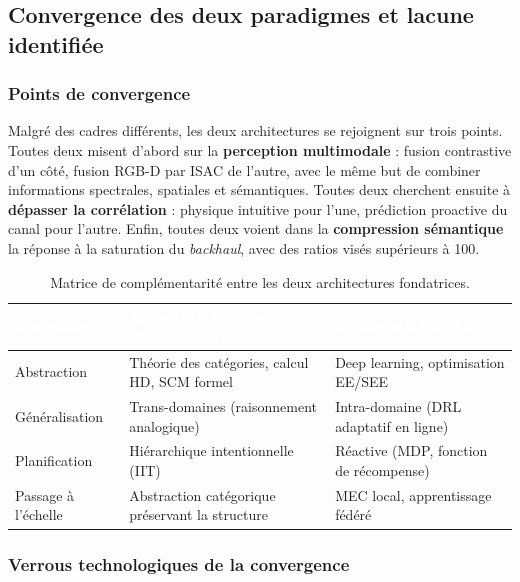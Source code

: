 \documentclass[12pt,a4paper,titlepage]{article}
\newcommand{\hd}[1]{\textcolor{white}{\textbf{#1}}}
\begin{document}
\subsection{Convergence des deux paradigmes et lacune identifiée}
\label{subsec:convergence}

\subsubsection{Points de convergence}

Malgré des cadres différents, les deux architectures se rejoignent sur trois points. Toutes deux misent d'abord sur la \textbf{perception multimodale} : fusion contrastive d'un côté, fusion RGB-D par ISAC de l'autre, avec le même but de combiner informations spectrales, spatiales et sémantiques. Toutes deux cherchent ensuite à \textbf{dépasser la corrélation} : physique intuitive pour l'une, prédiction proactive du canal pour l'autre. Enfin, toutes deux voient dans la \textbf{compression sémantique} la réponse à la saturation du \textit{backhaul}, avec des ratios visés supérieurs à 100.

\begin{table}[H]
    \centering
    \caption{Matrice de complémentarité entre les deux architectures fondatrices.}
    \label{tab:complementarity}
    \begin{tabularx}{\textwidth}{F{3cm}LL}
        \toprule
        \hd{Dimension} & \hd{Apport AGI-Native (Saad~\textit{et al.})} & \hd{Apport SA-VA-ISAC} \\
        \midrule
        Abstraction & Théorie des catégories, calcul HD, SCM formel & Deep learning, optimisation EE/SEE \\
        Généralisation & Trans-domaines (raisonnement analogique) & Intra-domaine (DRL adaptatif en ligne) \\
        Planification & Hiérarchique intentionnelle (IIT) & Réactive (MDP, fonction de récompense) \\
        Passage à l'échelle & Abstraction catégorique préservant la structure & MEC local, apprentissage fédéré \\
        \bottomrule
    \end{tabularx}
\end{table}

\subsubsection{Verrous technologiques de la convergence}
\end{document}
